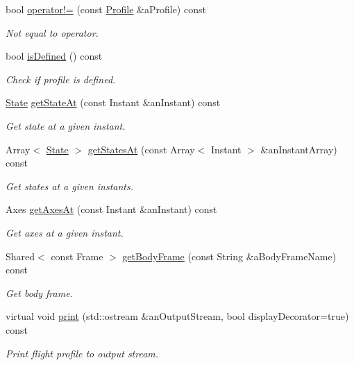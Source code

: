 \begin{DoxyCompactItemize}
bool \hyperlink{classostk_1_1astro_1_1flight_1_1_profile_a44b46cd860753f200185d6f2083ce5ec}{operator!=} (const \hyperlink{classostk_1_1astro_1_1flight_1_1_profile}{Profile} \&a\+Profile) const
\begin{DoxyCompactList}\small\item\em Not equal to operator. \end{DoxyCompactList}\item 
bool \hyperlink{classostk_1_1astro_1_1flight_1_1_profile_ad29d08d46698fae962e74105f16985a4}{is\+Defined} () const
\begin{DoxyCompactList}\small\item\em Check if profile is defined. \end{DoxyCompactList}\item 
\hyperlink{classostk_1_1astro_1_1flight_1_1profile_1_1_state}{State} \hyperlink{classostk_1_1astro_1_1flight_1_1_profile_a086758b767464ee2dc06cfda71fa3d48}{get\+State\+At} (const Instant \&an\+Instant) const
\begin{DoxyCompactList}\small\item\em Get state at a given instant. \end{DoxyCompactList}\item 
Array$<$ \hyperlink{classostk_1_1astro_1_1flight_1_1profile_1_1_state}{State} $>$ \hyperlink{classostk_1_1astro_1_1flight_1_1_profile_af35830c9e26ca7fffcc6e7e3ce86e9b2}{get\+States\+At} (const Array$<$ Instant $>$ \&an\+Instant\+Array) const
\begin{DoxyCompactList}\small\item\em Get states at a given instants. \end{DoxyCompactList}\item 
Axes \hyperlink{classostk_1_1astro_1_1flight_1_1_profile_a04d4ef9a89d42586e8a782d1af9ee031}{get\+Axes\+At} (const Instant \&an\+Instant) const
\begin{DoxyCompactList}\small\item\em Get axes at a given instant. \end{DoxyCompactList}\item 
Shared$<$ const Frame $>$ \hyperlink{classostk_1_1astro_1_1flight_1_1_profile_a24c6cb3e5d8e567bf3d5030e79300266}{get\+Body\+Frame} (const String \&a\+Body\+Frame\+Name) const
\begin{DoxyCompactList}\small\item\em Get body frame. \end{DoxyCompactList}\item 
virtual void \hyperlink{classostk_1_1astro_1_1flight_1_1_profile_a006797a25daa09426084c4df95e13b83}{print} (std\+::ostream \&an\+Output\+Stream, bool display\+Decorator=true) const
\begin{DoxyCompactList}\small\item\em Print flight profile to output stream. \end{DoxyCompactList}\end{DoxyCompactItemize}
